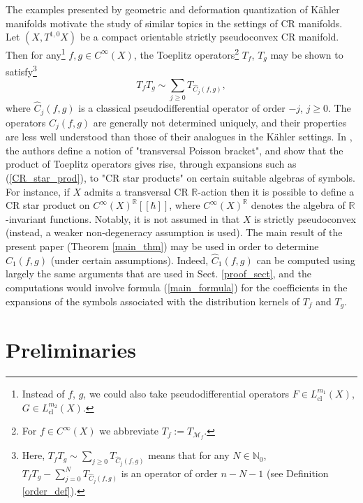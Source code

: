 \documentclass{article}
\newcommand{\RR}{\mathbb R}
\newcommand{\NN}{\mathbb N}
\newcommand{\mcm}{\mathcal M}
\DeclareMathOperator{\cl}{cl}
\begin{document}
The examples presented by geometric and deformation quantization of K\"{a}hler manifolds motivate the study of similar topics in the settings of CR manifolds. Let $(X, T^{1,0}X)$ be a compact orientable strictly pseudoconvex CR manifold. Then for any\footnote{Instead of $f$, $g$, we could also take pseudodifferential operators $F \in L^{m_1}_{\cl}(X)$, $G \in L^{m_2}_{\cl}(X)$.} $f, g \in C^\infty(X)$, the Toeplitz operators\footnote{For $f \in C^\infty(X)$ we abbreviate $T_f := T_{\mcm_f}$.} $T_f$, $T_g$ may be shown to satisfy\footnote{Here, $T_f T_g \sim \sum_{j \ge 0} T_{\hat C_j(f,g)}$ means that for any $N\in \NN_0$, $T_{f} T_g - \sum_{j=0}^N T_{\hat C_j(f,g)}$ is an operator of order $n-N-1$ (see Definition \ref{order_def}).} \begin{equation}\label{CR_star_prod}T_f T_g \sim \sum_{j \ge 0} T_{\hat C_j(f,g)},\end{equation}
where $\hat C_j(f,g)$ is a classical pseudodifferential operator of order $-j$, $j \ge 0$. The operators $\hat C_j(f,g)$ are generally not determined uniquely, and their properties are less well understood than those of their analogues in the K\"{a}hler settings.
%
%
In \cite{gh2}, the authors define a notion of "transversal Poisson bracket", and show that the product of Toeplitz operators gives rise, through expansions such as (\ref{CR_star_prod}), to "CR star products" on certain suitable algebras of symbols. For instance, if $X$ admits a transversal CR $\RR$-action then it is possible to define a CR star product on $C^\infty(X)^{\RR}[[\hbar]]$, where $C^\infty(X)^{\RR}$ denotes the algebra of $\RR$-invariant functions. Notably, it is not assumed in \cite{gh2} that $X$ is strictly pseudoconvex (instead, a weaker non-degeneracy assumption is used).
%
%
The main result of the present paper (Theorem \ref{main_thm}) may be used in order to determine $\hat C_1(f,g)$ (under certain assumptions). Indeed, $\hat C_1(f,g)$ can be computed using largely the same arguments that are used in Sect. \ref{proof_sect}, and the computations would involve formula (\ref{main_formula}) for the coefficients in the expansions of the symbols associated with the distribution kernels of $T_f$ and $T_g$.
%
%
%
%
%
\section{Preliminaries}\label{prelim_sect}
%
\end{document}
